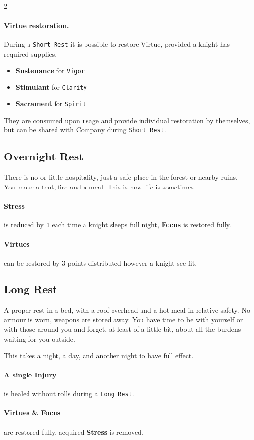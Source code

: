 \documentclass{osr-template/zine}
\begin{document}
\begin{multicols*}{2}
\paragraph{Virtue restoration.} During a \texttt{Short Rest} it is possible to restore Virtue, provided a knight has required supplies.
\begin{itemize}[nosep]
    \item[\ding{60}] \textbf{Sustenance} for \texttt{Vigor}
    \item[\ding{60}] \textbf{Stimulant} for \texttt{Clarity}
    \item[\ding{60}] \textbf{Sacrament} for \texttt{Spirit}
\end{itemize} They are consumed upon usage and provide individual restoration by themselves, but can be shared with Company during \texttt{Short Rest}.

\subsection*{Overnight Rest}

There is no or little hospitality, just a safe place in the forest or nearby ruins. You make a tent, fire and a meal.
This is how life is sometimes.

\paragraph{Stress} is reduced by \texttt{1} each time a knight sleeps full night, \textbf{Focus} is restored fully.

\paragraph{Virtues} can be restored by 3 points distributed however a knight see fit.

\subsection*{Long Rest}

A proper rest in a bed, with a roof overhead and a hot meal in relative safety.
No armour is worn, weapons are stored away.
You have time to be with yourself or with those around you and forget, at least of a little bit, about all the burdens waiting for you outside.

This takes a night, a day, and another night to have full effect.

\paragraph{A single Injury} is healed without rolls during a \texttt{Long Rest}.

\paragraph{Virtues \& Focus} are restored fully, acquired \textbf{Stress} is removed.

\end{multicols*}
\end{document}
